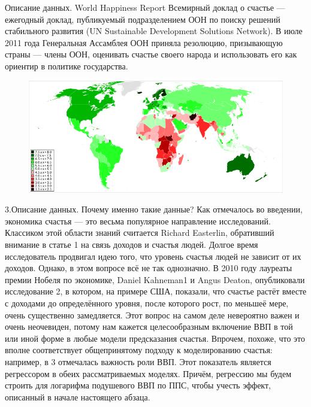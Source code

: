 \documentclass[aspectratio=169]{beamer}
\begin{document}
\begin{frame}{Описание данных. World Happiness Report}
Всемирный доклад о счастье  — ежегодный доклад, публикуемый подразделением ООН по поиску решений стабильного развития (UN Sustainable Development Solutions Network). В июле 2011 года Генеральная Ассамблея ООН приняла резолюцию, призывающую страны — члены ООН, оценивать счастье своего народа и использовать его как ориентир в политике государства. 

\begin{figure} \label{hompic}
            \centering
            \includegraphics[scale=0.4]{Union5.png}
    \end{figure}

\end{frame}

\begin{frame}{3.Описание данных. Почему именно такие данные?}
\small
Как отмечалось во введении, экономика счастья — это весьма популярное направление исследований. Классиком этой области знаний считается Richard Easterlin, обративший внимание в статье 1 на связь доходов и счастья людей. Долгое время исследователь продвигал идею того, что уровень счастья людей не зависит от их доходов.
\hfill \break
\hfill \break
Однако, в этом вопросе всё не так однозначно. В 2010 году лауреаты премии Нобеля по экономике, Daniel Kahneman1 и Angus Deaton, опубликовали исследование 2, в котором, на примере США, показали, что счастье растёт вместе с доходами до определённого уровня, после которого рост, по меньшеё мере, очень существенно замедляется. Этот вопрос на самом деле невероятно важен и очень неочевиден, потому нам кажется целесообразным включение ВВП в той или иной форме в любые модели предсказания счастья. Впрочем, похоже, что это вполне соответствует общепринятому подходу к моделированию счастья: например, в 3 отмечалась важность роли ВВП. Этот показатель является регрессором в обеих рассматриваемых моделях. Причём, регрессию мы будем строить для логарифма подушевого ВВП по ППС, чтобы учесть эффект, описанный в начале настоящего
абзаца.

\end{frame}
\end{document}
